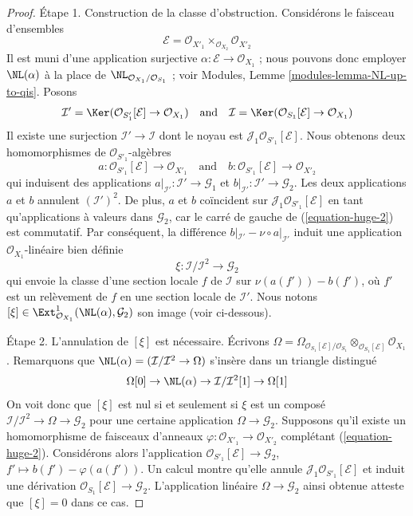\begin{proof}
\medskip\noindent
Étape 1. Construction de la classe d'obstruction. Considérons le faisceau
d'ensembles
$$
\mathcal{E} = \mathcal{O}_{X'_1} \times_{\mathcal{O}_{X_2}} \mathcal{O}_{X'_2}
$$
Il est muni d'une application surjective
$\alpha : \mathcal{E} \to \mathcal{O}_{X_1}$ ; nous pouvons donc employer
$\NL(\alpha)$ à la place de
$\NL_{\mathcal{O}_{X_1}/\mathcal{O}_{S_1}}$ ; voir Modules, Lemme
\ref{modules-lemma-NL-up-to-qis}.
Posons
$$
\mathcal{I}' =
\Ker(\mathcal{O}_{S'_1}[\mathcal{E}] \to \mathcal{O}_{X_1})
\quad\text{and}\quad
\mathcal{I} =
\Ker(\mathcal{O}_{S_1}[\mathcal{E}] \to \mathcal{O}_{X_1})
$$
Il existe une surjection $\mathcal{I}' \to \mathcal{I}$ dont le noyau est
$\mathcal{J}_1\mathcal{O}_{S'_1}[\mathcal{E}]$.
Nous obtenons deux homomorphismes de $\mathcal{O}_{S'_1}$-algèbres
$$
a : \mathcal{O}_{S'_1}[\mathcal{E}] \to \mathcal{O}_{X'_1}
\quad\text{and}\quad
b : \mathcal{O}_{S'_1}[\mathcal{E}] \to \mathcal{O}_{X'_2}
$$
qui induisent des applications
$a|_{\mathcal{I}'} : \mathcal{I}' \to \mathcal{G}_1$ et
$b|_{\mathcal{I}'} : \mathcal{I}' \to \mathcal{G}_2$.
Les deux applications $a$ et $b$ annulent $(\mathcal{I}')^2$.
De plus, $a$ et $b$ coïncident sur
$\mathcal{J}_1\mathcal{O}_{S'_1}[\mathcal{E}]$ en tant qu'applications à
valeurs dans $\mathcal{G}_2$, car le carré de gauche de
(\ref{equation-huge-2}) est commutatif. Par conséquent, la différence
$b|_{\mathcal{I}'} - \nu \circ a|_{\mathcal{I}'}$
induit une application $\mathcal{O}_{X_1}$-linéaire bien définie
$$
\xi : \mathcal{I}/\mathcal{I}^2 \longrightarrow \mathcal{G}_2
$$
qui envoie la classe d'une section locale $f$ de $\mathcal{I}$ sur
$\nu(a(f')) - b(f')$, où $f'$ est un relèvement de $f$ en une section locale
de $\mathcal{I}'$. Nous notons
$[\xi] \in \Ext^1_{\mathcal{O}_{X_1}}(\NL(\alpha), \mathcal{G}_2)$
son image (voir ci-dessous).

\medskip\noindent
Étape 2. L'annulation de $[\xi]$ est nécessaire. Écrivons
$\Omega = \Omega_{\mathcal{O}_{S_1}[\mathcal{E}]/\mathcal{O}_{S_1}}
\otimes_{\mathcal{O}_{S_1}[\mathcal{E}]} \mathcal{O}_{X_1}$.
Remarquons que $\NL(\alpha) = (\mathcal{I}/\mathcal{I}^2 \to \Omega)$
s'insère dans un triangle distingué
$$
\Omega[0] \to
\NL(\alpha) \to
\mathcal{I}/\mathcal{I}^2[1] \to
\Omega[1]
$$
On voit donc que $[\xi]$ est nul si et seulement si $\xi$ est un composé
$\mathcal{I}/\mathcal{I}^2 \to \Omega \to \mathcal{G}_2$
pour une certaine application $\Omega \to \mathcal{G}_2$. Supposons qu'il
existe un homomorphisme de faisceaux d'anneaux
$\varphi : \mathcal{O}_{X'_1} \to \mathcal{O}_{X'_2}$ complétant
(\ref{equation-huge-2}). Considérons alors l'application
$\mathcal{O}_{S'_1}[\mathcal{E}] \to \mathcal{G}_2$,
$f' \mapsto b(f') - \varphi(a(f'))$. Un calcul montre qu'elle annule
$\mathcal{J}_1\mathcal{O}_{S'_1}[\mathcal{E}]$ et induit une dérivation
$\mathcal{O}_{S_1}[\mathcal{E}] \to \mathcal{G}_2$.
L'application linéaire $\Omega \to \mathcal{G}_2$ ainsi obtenue atteste que
$[\xi] = 0$ dans ce cas.


\end{proof}
